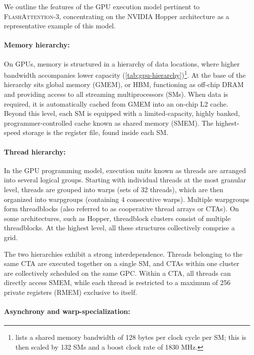 \begin{enumerate}
We outline the features of the GPU execution model pertinent to \textsc{FlashAttention-3}, concentrating on the NVIDIA Hopper architecture as a representative example of this model.

\paragraph{Memory hierarchy:} On GPUs, memory is structured in a hierarchy of data locations, where higher bandwidth accompanies lower capacity (\cref{tab:gpu-hierarchy})\footnote{\citet{luo2024benchmarking} lists a shared memory bandwidth of 128 bytes per clock cycle per SM; this is then scaled by 132 SMs and a boost clock rate of 1830 MHz.}. At the base of the hierarchy sits global memory (GMEM), or HBM, functioning as off-chip DRAM and providing access to all streaming multiprocessors (SMs). When data is required, it is automatically cached from GMEM into an on-chip L2 cache. Beyond this level, each SM is equipped with a limited-capacity, highly banked, programmer-controlled cache known as shared memory (SMEM). The highest-speed storage is the register file, found inside each SM.

\paragraph{Thread hierarchy:} In the GPU programming model, execution units known as threads are arranged into several logical groups. Starting with individual threads at the most granular level, threads are grouped into warps (sets of 32 threads), which are then organized into warpgroups (containing 4 consecutive warps). Multiple warpgroups form threadblocks (also referred to as cooperative thread arrays or CTAs). On some architectures, such as Hopper, threadblock clusters consist of multiple threadblocks. At the highest level, all these structures collectively comprise a grid.

The two hierarchies exhibit a strong interdependence. Threads belonging to the same CTA are executed together on a single SM, and CTAs within one cluster are collectively scheduled on the same GPC. Within a CTA, all threads can directly access SMEM, while each thread is restricted to a maximum of 256 private registers (RMEM) exclusive to itself.

\paragraph{Asynchrony and warp-specialization:}


\end{enumerate}
